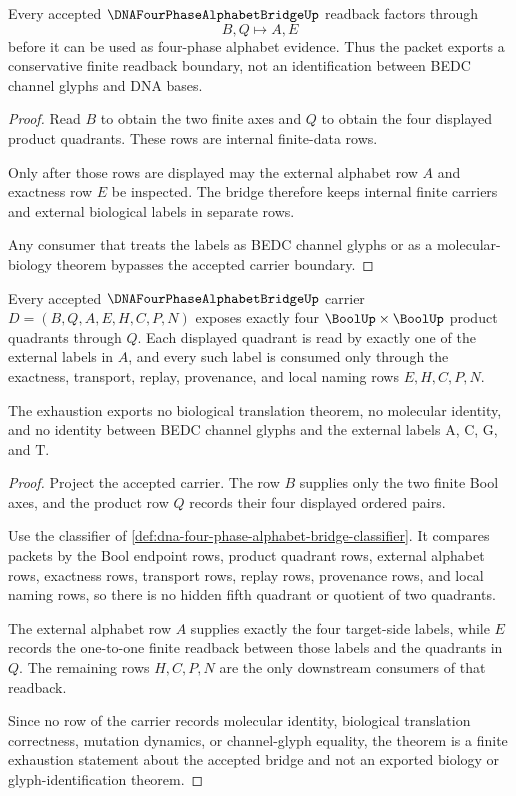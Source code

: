 \begin{theorem}
\label{thm:dna-four-phase-alphabet-bridge-readback-boundary}
Every accepted $\DNAFourPhaseAlphabetBridgeUp$ readback factors through
$$
B,Q \longmapsto A,E
$$
before it can be used as four-phase alphabet evidence. Thus the packet exports a conservative finite readback boundary, not an identification between BEDC channel glyphs and DNA bases.
\end{theorem}
\begin{proof}
Read $B$ to obtain the two finite axes and $Q$ to obtain the four displayed product quadrants. These rows are internal finite-data rows.

Only after those rows are displayed may the external alphabet row $A$ and exactness row $E$ be inspected. The bridge therefore keeps internal finite carriers and external biological labels in separate rows.

Any consumer that treats the labels as BEDC channel glyphs or as a molecular-biology theorem bypasses the accepted carrier boundary.
\end{proof}

\begin{theorem}
\label{thm:dna-four-phase-alphabet-bridge-quadrant-exhaustion}
Every accepted $\DNAFourPhaseAlphabetBridgeUp$ carrier $D=(B,Q,A,E,H,C,P,N)$ exposes exactly four $\BoolUp \times \BoolUp$ product quadrants through $Q$. Each displayed quadrant is read by exactly one of the external labels in $A$, and every such label is consumed only through the exactness, transport, replay, provenance, and local naming rows $E,H,C,P,N$.

The exhaustion exports no biological translation theorem, no molecular identity, and no identity between BEDC channel glyphs and the external labels $\mathrm{A}$, $\mathrm{C}$, $\mathrm{G}$, and $\mathrm{T}$.
\end{theorem}
\begin{proof}
Project the accepted carrier. The row $B$ supplies only the two finite Bool axes, and the product row $Q$ records their four displayed ordered pairs.

Use the classifier of \autoref{def:dna-four-phase-alphabet-bridge-classifier}. It compares packets by the Bool endpoint rows, product quadrant rows, external alphabet rows, exactness rows, transport rows, replay rows, provenance rows, and local naming rows, so there is no hidden fifth quadrant or quotient of two quadrants.

The external alphabet row $A$ supplies exactly the four target-side labels, while $E$ records the one-to-one finite readback between those labels and the quadrants in $Q$. The remaining rows $H,C,P,N$ are the only downstream consumers of that readback.

Since no row of the carrier records molecular identity, biological translation correctness, mutation dynamics, or channel-glyph equality, the theorem is a finite exhaustion statement about the accepted bridge and not an exported biology or glyph-identification theorem.
\end{proof}

